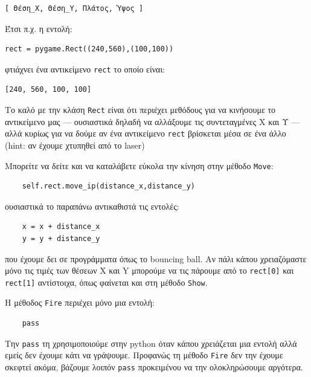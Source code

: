 \begin{verbatim}
[ Θέση_Χ, Θέση_Y, Πλάτος, Ύψος ]
\end{verbatim}

Έτσι π.χ. η εντολή:

\begin{verbatim}
rect = pygame.Rect((240,560),(100,100))
\end{verbatim}

φτιάχνει ένα αντικείμενο {\tt rect} το οποίο είναι:

\begin{verbatim}
[240, 560, 100, 100]
\end{verbatim}

Το καλό με την κλάση {\tt Rect} είναι ότι περιέχει μεθόδους για να κινήσουμε το αντικείμενο μας --- ουσιαστικά δηλαδή να αλλάξουμε τις συντεταγμένες Χ και Υ --- αλλά κυρίως για να δούμε αν ένα αντικείμενο {\tt rect} βρίσκεται μέσα σε ένα άλλο (hint: αν έχουμε χτυπηθεί από το laser)

Μπορείτε να δείτε και να καταλάβετε εύκολα την κίνηση στην μέθοδο {\tt Move}:

\begin{verbatim}
    self.rect.move_ip(distance_x,distance_y)
\end{verbatim}

ουσιαστικά το παραπάνω αντικαθιστά τις εντολές:

\begin{verbatim}
    x = x + distance_x
    y = y + distance_y
\end{verbatim}

που έχουμε δει σε προγράμματα όπως το bouncing ball. Αν πάλι κάπου χρειαζόμαστε μόνο τις τιμές των θέσεων X και Y μπορούμε να τις πάρουμε από το {\tt rect[0]} και {\tt rect[1]} αντίστοιχα, όπως φαίνεται και στη μέθοδο {\tt Show}.

Η μέθοδος {\tt Fire} περιέχει μόνο μια εντολή:

\begin{verbatim}
    pass
\end{verbatim}

Την {\tt pass} τη χρησιμοποιούμε στην python όταν κάπου χρειάζεται μια εντολή αλλά εμείς δεν έχουμε κάτι να γράψουμε. Προφανώς τη μέθοδο {\tt Fire} δεν την έχουμε σκεφτεί ακόμα, βάζουμε λοιπόν {\tt pass} προκειμένου να την ολοκληρώσουμε αργότερα.

